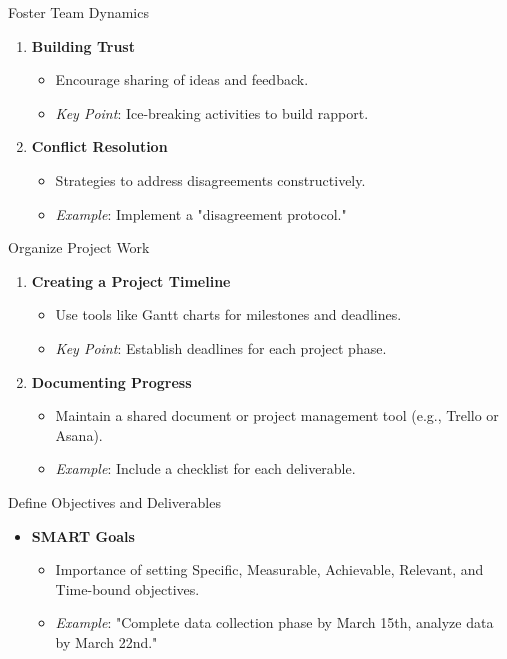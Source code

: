 \documentclass[aspectratio=169]{beamer}
\begin{document}
\begin{frame}[fragile]{Foster Team Dynamics}
    \begin{enumerate}
        \item \textbf{Building Trust}
            \begin{itemize}
                \item Encourage sharing of ideas and feedback.
                \item \textit{Key Point}: Ice-breaking activities to build rapport.
            \end{itemize}
        
        \item \textbf{Conflict Resolution}
            \begin{itemize}
                \item Strategies to address disagreements constructively.
                \item \textit{Example}: Implement a "disagreement protocol."
            \end{itemize}
    \end{enumerate}
\end{frame}

\begin{frame}[fragile]{Organize Project Work}
    \begin{enumerate}
        \item \textbf{Creating a Project Timeline}
            \begin{itemize}
                \item Use tools like Gantt charts for milestones and deadlines.
                \item \textit{Key Point}: Establish deadlines for each project phase.
            \end{itemize}
        
        \item \textbf{Documenting Progress}
            \begin{itemize}
                \item Maintain a shared document or project management tool (e.g., Trello or Asana).
                \item \textit{Example}: Include a checklist for each deliverable.
            \end{itemize}
    \end{enumerate}
\end{frame}

\begin{frame}[fragile]{Define Objectives and Deliverables}
    \begin{itemize}
        \item \textbf{SMART Goals}
            \begin{itemize}
                \item Importance of setting Specific, Measurable, Achievable, Relevant, and Time-bound objectives.
                \item \textit{Example}: "Complete data collection phase by March 15th, analyze data by March 22nd."
            \end{itemize}
    \end{itemize}
\end{frame}
\end{document}
